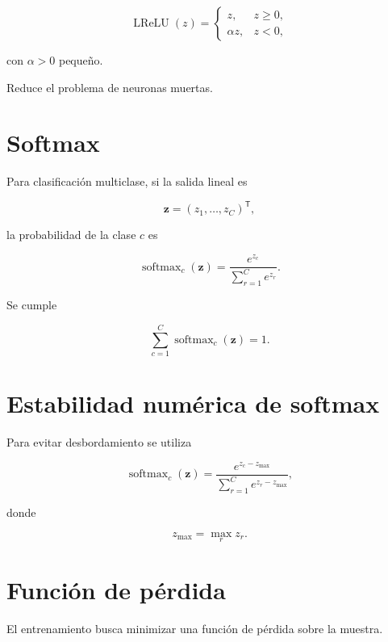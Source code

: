\documentclass[
  spanish,
  10.5pt,
  letterpaper,
  DIV=11,
  numbers=noendperiod,
  oneside,
  open=any]{scrreprt}
\theoremstyle{definition}
\theoremstyle{definition}
\theoremstyle{plain}
\theoremstyle{remark}
\begin{document}

\[
\operatorname{LReLU}(z)
=
\begin{cases}
z, & z\geq 0,\\
\alpha z, & z<0,
\end{cases}
\]

con \(\alpha>0\) pequeño.

Reduce el problema de neuronas muertas.

\section*{Softmax}\label{softmax}


Para clasificación multiclase, si la salida lineal es

\[
\mathbf{z}
=
(z_1,\ldots,z_C)^{\mathsf T},
\]

la probabilidad de la clase \(c\) es

\[
\operatorname{softmax}_c(\mathbf{z})
=
\frac{e^{z_c}}
{\sum_{r=1}^{C}e^{z_r}}.
\]

Se cumple

\[
\sum_{c=1}^{C}
\operatorname{softmax}_c(\mathbf{z})
=
1.
\]

\section*{Estabilidad numérica de
softmax}\label{estabilidad-numuxe9rica-de-softmax}


Para evitar desbordamiento se utiliza

\[
\operatorname{softmax}_c(\mathbf{z})
=
\frac{
e^{z_c-z_{\max}}
}{
\sum_{r=1}^{C}
e^{z_r-z_{\max}}
},
\]

donde

\[
z_{\max}
=
\max_r z_r.
\]

\section*{Función de pérdida}\label{funciuxf3n-de-puxe9rdida-1}


El entrenamiento busca minimizar una función de pérdida sobre la
muestra.
\end{document}
